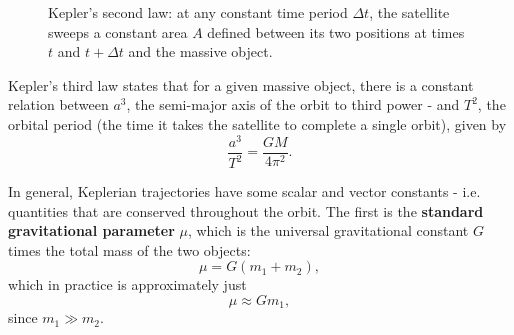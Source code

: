 \begin{figure}
	\begin{center}
	\end{center}
	\caption{Kepler's second law: at any constant time period $\Delta t$, the satellite sweeps a constant area $A$ defined between its two positions at times $t$ and $t+\Delta t$ and the massive object.}
	\label{fig:keplers_2nd_law}
\end{figure}

Kepler's third law states that for a given massive object, there is a constant relation between $a^{3}$, the semi-major axis of the orbit to third power - and $T^{2}$, the orbital period (the time it takes the satellite to complete a single orbit), given by
\begin{equation}
	\frac{a^{3}}{T^{2}} = \frac{GM}{4\pi^{2}}.
	\label{eq:keplers_3rd_law}
\end{equation}


In general, Keplerian trajectories have some scalar and vector constants - i.e. quantities that are conserved throughout the orbit. The first is the \textbf{standard gravitational parameter} $\mu$, which is the universal gravitational constant $G$ times the total mass of the two objects:
\begin{equation}
	\mu = G\left(m_{1}+m_{2}\right),
\end{equation}
which in practice is approximately just
\begin{equation}
	\mu \approx Gm_{1},
	\label{eq:standard_gravitational_parameter}
\end{equation}
since $m_{1}\gg m_{2}$.

